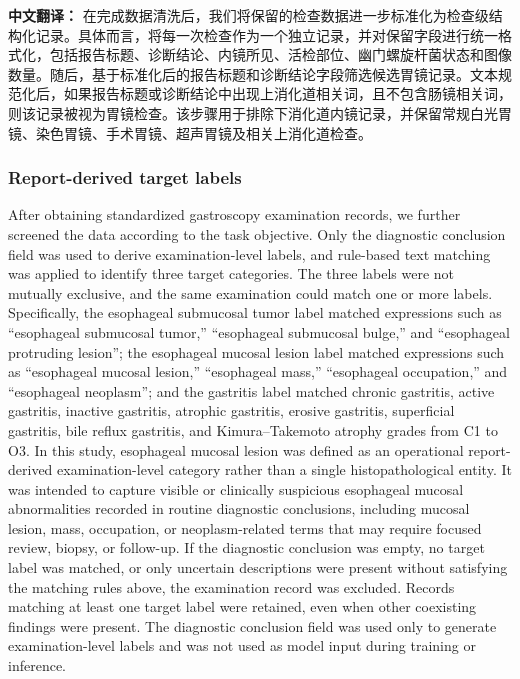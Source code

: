 \documentclass[Afour,sagev,times]{sagej}
\begin{document}
\textbf{中文翻译：} 在完成数据清洗后，我们将保留的检查数据进一步标准化为检查级结构化记录。具体而言，将每一次检查作为一个独立记录，并对保留字段进行统一格式化，包括报告标题、诊断结论、内镜所见、活检部位、幽门螺旋杆菌状态和图像数量。随后，基于标准化后的报告标题和诊断结论字段筛选候选胃镜记录。文本规范化后，如果报告标题或诊断结论中出现上消化道相关词，且不包含肠镜相关词，则该记录被视为胃镜检查。该步骤用于排除下消化道内镜记录，并保留常规白光胃镜、染色胃镜、手术胃镜、超声胃镜及相关上消化道检查。

\subsubsection{Report-derived target labels}
After obtaining standardized gastroscopy examination records, we further screened the data according to the task objective. Only the diagnostic conclusion field was used to derive examination-level labels, and rule-based text matching was applied to identify three target categories. The three labels were not mutually exclusive, and the same examination could match one or more labels. Specifically, the esophageal submucosal tumor label matched expressions such as ``esophageal submucosal tumor,'' ``esophageal submucosal bulge,'' and ``esophageal protruding lesion''; the esophageal mucosal lesion label matched expressions such as ``esophageal mucosal lesion,'' ``esophageal mass,'' ``esophageal occupation,'' and ``esophageal neoplasm''; and the gastritis label matched chronic gastritis, active gastritis, inactive gastritis, atrophic gastritis, erosive gastritis, superficial gastritis, bile reflux gastritis, and Kimura--Takemoto atrophy grades from C1 to O3.\cite{R16} In this study, esophageal mucosal lesion was defined as an operational report-derived examination-level category rather than a single histopathological entity. It was intended to capture visible or clinically suspicious esophageal mucosal abnormalities recorded in routine diagnostic conclusions, including mucosal lesion, mass, occupation, or neoplasm-related terms that may require focused review, biopsy, or follow-up. If the diagnostic conclusion was empty, no target label was matched, or only uncertain descriptions were present without satisfying the matching rules above, the examination record was excluded. Records matching at least one target label were retained, even when other coexisting findings were present. The diagnostic conclusion field was used only to generate examination-level labels and was not used as model input during training or inference.
\end{document}
